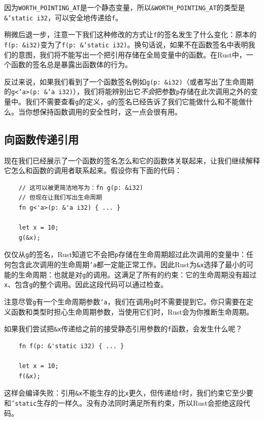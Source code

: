 因为\texttt{WORTH\_POINTING\_AT}是一个静态变量，所以\texttt{\&WORTH\_POINTING\_AT}的类型是\texttt{\&'static i32}，可以安全地传递给\texttt{f}。

稍微后退一步，注意一下我们这种修改的方式让\texttt{f}的签名发生了什么变化：原本的\texttt{f(p: \&i32)}变为了\texttt{f(p: \&'static i32)}。换句话说，如果不在函数签名中表明我们的意图，我们将不能写出一个把引用存储在全局变量中的函数。在Rust中，一个函数的签名总是暴露出函数体的行为。

反过来说，如果我们看到了一个函数签名例如\texttt{g(p: \&i32)}（或者写出了生命周期的\texttt{g<'a>(p: \&'a i32)}），我们将能辨别出它\emph{不会}把参数\texttt{p}存储在此次调用之外的变量中。我们不需要查看\texttt{g}的定义，\texttt{g}的签名已经告诉了我们它能做什么和不能做什么。当你想保持函数调用的安全性时，这一点会很有用。

\subsection{向函数传递引用}
现在我们已经展示了一个函数的签名怎么和它的函数体关联起来，让我们继续解释它怎么和函数的调用者联系起来。假设你有下面的代码：
\begin{verbatim}
    // 这可以被更简洁地写为：fn g(p: &i32)
    // 但现在让我们写出生命周期
    fn g<'a>(p: &'a i32) { ... }

    let x = 10;
    g(&x);
\end{verbatim}

仅仅从\texttt{g}的签名，Rust知道它不会把\texttt{p}存储在生命周期超过此次调用的变量中：任何包含此次调用的生命周期\texttt{'a}都一定能正常工作。因此Rust为\texttt{\&x}选择了最小的可能的生命周期：也就是对\texttt{g}的调用。这满足了所有的约束：它的生命周期没有超过\texttt{x}、包含\texttt{g}的整个调用。因此这段代码可以通过检查。

注意尽管\texttt{g}有一个生命周期参数\texttt{'a}，我们在调用\texttt{g}时不需要提到它。你只需要在定义函数和类型时担心生命周期参数，当使用它们时，Rust会为你推断生命周期。

如果我们尝试把\texttt{\&x}传递给之前的接受静态引用参数的\texttt{f}函数，会发生什么呢？
\begin{verbatim}
    fn f(p: &'static i32) { ... }

    let x = 10;
    f(&x);
\end{verbatim}

这样会编译失败：引用\texttt{\&x}不能生存的比\texttt{x}更久，但传递给\texttt{f}时，我们约束它至少要和\texttt{'static}生存的一样久。没有办法同时满足所有约束，所以Rust会拒绝这段代码。

